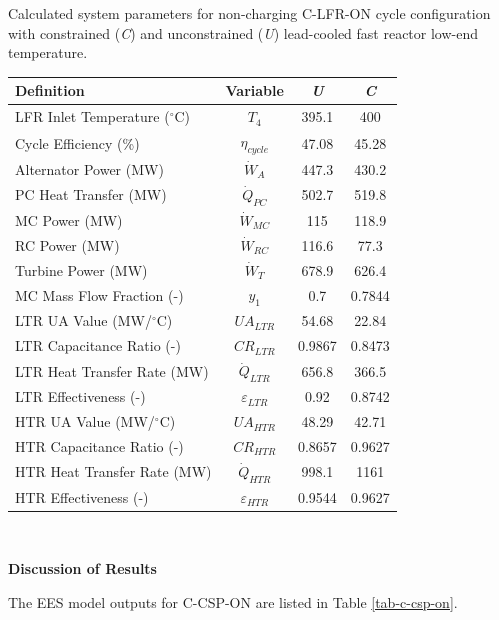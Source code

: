 \begin{paracol}{2}
\begin{specialtable}[H] 
    \caption{Calculated system parameters for non-charging C-LFR-ON cycle configuration with constrained (\textit{C}) and unconstrained (\textit{U}) lead-cooled fast reactor low-end temperature.\label{tab-c-lfr-on}}
    \begin{tabular}{lccc}
    \toprule
    \textbf{Definition} & \textbf{Variable} & \textit{U} & \textit{C}\\
    \midrule
    LFR Inlet Temperature ($^{\circ}$C)	&	$T_{4}$	&	395.1	&	400	\\
    Cycle Efficiency (\%)	&	$\eta_{cycle}$	&	47.08	&	45.28	\\
    Alternator Power (MW)	&	$\dot{W}_{A}$	&	447.3	&	430.2	\\
    PC Heat Transfer (MW)	&	$\dot{Q}_{PC}$	&	502.7	&	519.8	\\
    MC Power (MW)	&	$\dot{W}_{MC}$	&	115	&	118.9	\\
    RC Power (MW)	&	$\dot{W}_{RC}$	&	116.6	&	77.3	\\
    Turbine Power (MW)	&	$\dot{W}_{T}$	&	678.9	&	626.4	\\
    MC Mass Flow Fraction (-)	&	$y_{1}$	&	0.7	&	0.7844	\\
    LTR UA Value (MW/$^{\circ}$C)	&	$UA_{LTR}$	&	54.68	&	22.84	\\
    LTR Capacitance Ratio (-)	&	$CR_{LTR}$	&	0.9867	&	0.8473	\\
    LTR Heat Transfer Rate (MW)	&	$\dot{Q}_{LTR}$	&	656.8	&	366.5	\\
    LTR Effectiveness (-)	&	$\varepsilon_{LTR}$	&	0.92	&	0.8742	\\
    HTR UA Value (MW/$^{\circ}$C)	&	$UA_{HTR}$	&	48.29	&	42.71	\\
    HTR Capacitance Ratio (-)	&	$CR_{HTR}$	&	0.8657	&	0.9627	\\
    HTR Heat Transfer Rate (MW)	&	$\dot{Q}_{HTR}$	&	998.1	&	1161	\\
    HTR Effectiveness (-)	&	$\varepsilon_{HTR}$	&	0.9544	&	0.9627	\\
    \bottomrule
    \end{tabular}\\
\end{specialtable}

\textbf{Discussion of Results}



The EES model outputs for C-CSP-ON are listed in Table \ref{tab-c-csp-on}.


\end{paracol}
